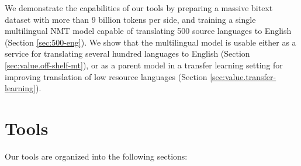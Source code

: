 We demonstrate the capabilities of our tools by preparing a massive bitext dataset with more than 9 billion tokens per side, and training a single multilingual NMT model capable of translating 500 source languages to English (Section \ref{sec:500-eng}).
We show that the multilingual model is usable either as a service for translating several hundred languages to English (Section \ref{sec:value.off-shelf-mt}), or as a parent model in a transfer learning setting for improving translation of low resource languages (Section \ref{sec:value.transfer-learning}). 


\section{Tools}
\label{sec:tools}
 Our tools are organized into the following sections:

\begin{comment}
Specifically, \textsc{MTData} (Section \ref{sec:mtdata}) is useful for preparing training data for hundreds of languages, 
\textsc{NLCodec} (section \ref{sec:nlcodec}) is useful for efficiently proprocessing, storing, and accessing the training data,
and \textsc{RTG} (section \ref{sec:rtg}) NMT toolkit for training an MT model. 
In addition, all these tools are built with reproducibility and usability in mind. 
These tools have been made publicly available, with permissive open source licenses.
We hope these tools help advance MT efforts beyond the top few high resource languages. 
\end{comment}

